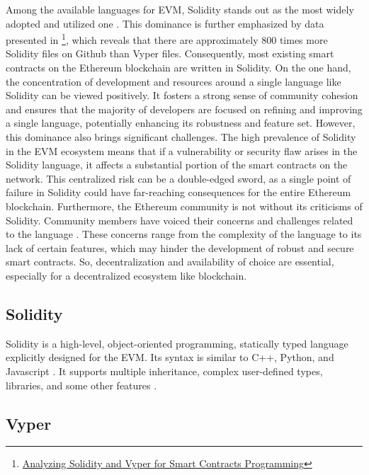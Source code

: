 Among the available languages for EVM, Solidity stands out as the most widely adopted and utilized one \cite{SolidityWidelyUsed, SolidityDevsChallenges}. This dominance is further emphasized by data presented in \footnote{\href{https://blockchain.oodles.io/blog/solidity-vyper-smart-contracts-programming/}{Analyzing Solidity and Vyper for Smart Contracts Programming}}, which reveals that there are approximately 800 times more Solidity files on Github than Vyper files. Consequently, most existing smart contracts on the Ethereum blockchain are written in Solidity. On the one hand, the concentration of development and resources around a single language like Solidity can be viewed positively. It fosters a strong sense of community cohesion and ensures that the majority of developers are focused on refining and improving a single language, potentially enhancing its robustness and feature set. However, this dominance also brings significant challenges. The high prevalence of Solidity in the EVM ecosystem means that if a vulnerability or security flaw arises in the Solidity language, it affects a substantial portion of the smart contracts on the network. This centralized risk can be a double-edged sword, as a single point of failure in Solidity could have far-reaching consequences for the entire Ethereum blockchain. Furthermore, the Ethereum community is not without its criticisms of Solidity. Community members have voiced their concerns and challenges related to the language \cite{SolidityDevsChallenges}. These concerns range from the complexity of the language to its lack of certain features, which may hinder the development of robust and secure smart contracts. So, decentralization and availability of choice are essential, especially for a decentralized ecosystem like blockchain.

\subsection{Solidity}

Solidity is a high-level, object-oriented programming, statically typed language explicitly designed for the EVM. Its syntax is similar to C++, Python, and Javascript \cite{SolidityInspirasion}. It supports multiple inheritance, complex user-defined types, libraries, and some other features \cite{SolidityFeatures}.

\subsection{Vyper}

